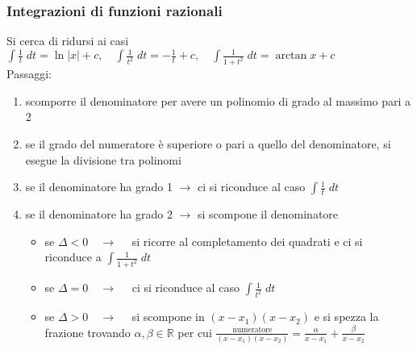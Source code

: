 \documentclass[a4paper]{article}
\begin{document}
\subsubsection*{Integrazioni di funzioni razionali}
Si cerca di ridursi ai casi \(\displaystyle \int \frac{1}{t} \; dt = \ln \left|x\right| + c, \quad \int \frac{1}{t^2} \; dt = - \frac{1}{t} + c, \quad \int \frac{1}{1+t^2} \; dt = \arctan x + c\) \\
Passaggi:
\begin{enumerate}
	\item scomporre il denominatore per avere un polinomio di grado al massimo pari a 2
	\item se il grado del numeratore è superiore o pari a quello del denominatore, si esegue la divisione tra polinomi
	\item se il denominatore ha grado 1 \(\rightarrow\) ci si riconduce al caso \(\displaystyle \int \frac{1}{t} \; dt\)
	\item se il denominatore ha grado 2 \(\rightarrow\) si scompone il denominatore
	\begin{itemize}
		\item se \(\Delta < 0 \quad \rightarrow \quad\) si ricorre al completamento dei quadrati e ci si riconduce a \(\displaystyle \int \frac{1}{1 + t^2} \; dt\)
		\item se \(\Delta = 0 \quad \rightarrow \quad\) ci si riconduce al caso \(\displaystyle \int \frac{1}{t^2} \; dt\)
		\item se \(\Delta > 0 \quad \rightarrow \quad\) si scompone in \((x-x_1)(x-x_2)\) e si spezza la frazione trovando \(\alpha, \beta \in \mathbb{R}\) per cui
		\(\displaystyle \frac{\text{numeratore}}{(x-x_1)(x-x_2)} = \frac{\alpha}{x-x_1} + \frac{\beta}{x-x_2}\)
	\end{itemize}
\end{enumerate}
\end{document}
